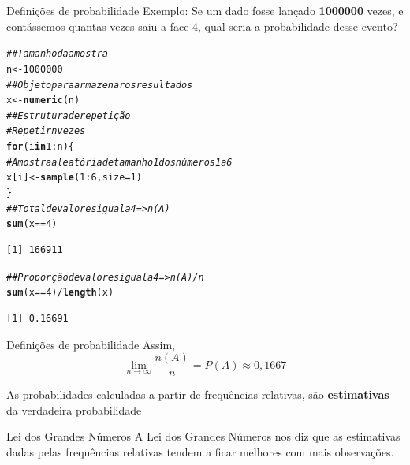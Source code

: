 \documentclass[10pt]{beamer}\usepackage[]{graphicx}\usepackage[]{color}
\makeatletter
\newcommand{\hlnum}[1]{\textcolor[rgb]{0.686,0.059,0.569}{#1}}%
\newcommand{\hlcom}[1]{\textcolor[rgb]{0.678,0.584,0.686}{\textit{#1}}}%
\newcommand{\hlopt}[1]{\textcolor[rgb]{0,0,0}{#1}}%
\newcommand{\hlstd}[1]{\textcolor[rgb]{0.345,0.345,0.345}{#1}}%
\newcommand{\hlkwa}[1]{\textcolor[rgb]{0.161,0.373,0.58}{\textbf{#1}}}%
\newcommand{\hlkwb}[1]{\textcolor[rgb]{0.69,0.353,0.396}{#1}}%
\newcommand{\hlkwc}[1]{\textcolor[rgb]{0.333,0.667,0.333}{#1}}%
\newcommand{\hlkwd}[1]{\textcolor[rgb]{0.737,0.353,0.396}{\textbf{#1}}}%
\newenvironment{kframe}{%
 \def\at@end@of@kframe{}%
 \ifinner\ifhmode%
  \def\at@end@of@kframe{\end{minipage}}%
  \begin{minipage}{\columnwidth}%
 \fi\fi%
 \def\FrameCommand##1{\hskip\@totalleftmargin \hskip-\fboxsep
 \colorbox{shadecolor}{##1}\hskip-\fboxsep
     \hskip-\linewidth \hskip-\@totalleftmargin \hskip\columnwidth}%
 \MakeFramed {\advance\hsize-\width
   \@totalleftmargin\z@ \linewidth\hsize
   \@setminipage}}%
 {\par\unskip\endMakeFramed%
 \at@end@of@kframe}
\newenvironment{knitrout}{}{} %
\theoremstyle{definition}
\makeatother
\begin{document}
\begin{frame}[fragile]{Definições de probabilidade}
  Exemplo: Se um dado fosse lançado \textbf{1000000} vezes, e contássemos
  quantas vezes saiu a face 4, qual seria a probabilidade desse evento?
\begin{knitrout}\footnotesize
{}\color{fgcolor}\begin{kframe}
\begin{alltt}
\hlcom{## Tamanho da amostra}
\hlstd{n} \hlkwb{<-} \hlnum{1000000}
\hlcom{## Objeto para armazenar os resultados}
\hlstd{x} \hlkwb{<-} \hlkwd{numeric}\hlstd{(n)}
\hlcom{## Estrutura de repetição}
\hlcom{# Repetir n vezes}
\hlkwa{for}\hlstd{(i} \hlkwa{in} \hlnum{1}\hlopt{:}\hlstd{n)\{}
    \hlcom{# Amostra aleatória de tamanho 1 dos números 1 a 6}
    \hlstd{x[i]} \hlkwb{<-} \hlkwd{sample}\hlstd{(}\hlnum{1}\hlopt{:}\hlnum{6}\hlstd{,} \hlkwc{size} \hlstd{=} \hlnum{1}\hlstd{)}
\hlstd{\}}
\hlcom{## Total de valores igual a 4 => n(A)}
\hlkwd{sum}\hlstd{(x} \hlopt{==} \hlnum{4}\hlstd{)}
\end{alltt}
\begin{verbatim}
[1] 166911
\end{verbatim}
\begin{alltt}
\hlcom{## Proporção de valores igual a 4 => n(A)/n}
\hlkwd{sum}\hlstd{(x} \hlopt{==} \hlnum{4}\hlstd{)}\hlopt{/}\hlkwd{length}\hlstd{(x)}
\end{alltt}
\begin{verbatim}
[1] 0.16691
\end{verbatim}
\end{kframe}
\end{knitrout}
\end{frame}

\begin{frame}[fragile]{Definições de probabilidade}
  Assim,
  \begin{equation*}
    \lim_{n \rightarrow \infty} \frac{n(A)}{n} = P(A) \approx 0,1667
  \end{equation*}
  \vspace{1em}

  As probabilidades calculadas a partir de frequências relativas, são
  \textbf{estimativas} da verdadeira probabilidade
  \vspace{1em}
  \begin{block}{Lei dos Grandes Números}
    A Lei dos Grandes Números nos diz que as estimativas dadas pelas
    frequências relativas tendem a ficar melhores com mais observações.
  \end{block}
\end{frame}
\end{document}
